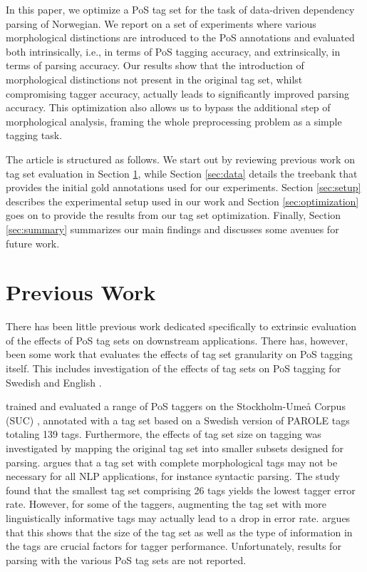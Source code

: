 \documentclass[11pt,a4paper]{article}
\begin{document}
In this paper, we optimize a PoS tag set for the task of data-driven dependency
parsing of Norwegian. We report on a set of experiments where various
morphological distinctions are introduced to the PoS annotations and evaluated
both intrinsically, i.e., in terms of PoS tagging accuracy, and extrinsically,
in terms of parsing accuracy. Our results show that the introduction of
morphological distinctions not present in the original tag set, whilst
compromising tagger accuracy, actually leads to significantly improved parsing
accuracy. This optimization also allows us to bypass the additional step of
morphological analysis, framing the whole preprocessing problem as a simple
tagging task.

The article is structured as follows. We start out by reviewing previous work
on tag set evaluation in Section \ref{sec:prev}, while Section \ref{sec:data}
details the treebank that provides the initial gold annotations used for our
experiments. Section \ref{sec:setup} describes the experimental setup used in
our work and Section \ref{sec:optimization} goes on to provide the results from
our tag set optimization. Finally, Section \ref{sec:summary} summarizes our
main findings and discusses some avenues for future work.

\section{Previous Work}
\label{sec:prev}
There has been little previous work dedicated specifically to extrinsic
evaluation of the effects of PoS tag sets on downstream applications.  There
has, however, been some work that evaluates the effects of tag set granularity
on PoS tagging itself. This includes investigation of the effects of tag sets
on PoS tagging for Swedish \cite{Meg:01,Meg:02} and English \cite{Mac:05}.

 trained and evaluated a range of PoS taggers on the
Stockholm-Umeå Corpus (SUC) \cite{Gus:Har:06}, annotated with a tag set based
on a Swedish version of PAROLE tags totaling 139 tags. Furthermore, the effects
of tag set size on tagging was investigated by mapping the original tag set
into smaller subsets designed for parsing.  argues that a tag
set with complete morphological tags may not be necessary for all NLP
applications, for instance syntactic parsing. The study found that the smallest
tag set comprising 26 tags yields the lowest tagger error rate. However, for
some of the taggers, augmenting the tag set with more linguistically
informative tags may actually lead to a drop in error rate. 
argues that this shows that the size of the tag set as well as the type of
information in the tags are crucial factors for tagger performance.
Unfortunately, results for parsing with the various PoS tag sets are not
reported.
\end{document}
